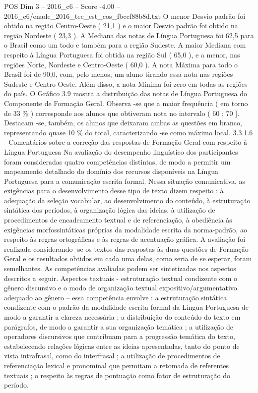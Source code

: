 \begin{textsample}{POS Dim 3 – 2016\_c6 – Score -4.00 – 2016\_c6/enade\_2016\_tec\_est\_cos\_fbccf88b8d.txt}
O menor Desvio padrão foi obtido na região Centro-Oeste ( 21,1 ) e o maior Desvio padrão foi obtido na região Nordeste ( 23,3 ).
A Mediana das notas de Língua Portuguesa foi 62,5 para o Brasil como um todo e também para a região Sudeste.
A maior Mediana com respeito à Língua Portuguesa foi obtida na região Sul ( 65,0 ), e a menor, nas regiões Norte, Nordeste e Centro-Oeste ( 60,0 ).
A nota Máxima para todo o Brasil foi de 90,0, com, pelo menos, um aluno tirando essa nota nas regiões Sudeste e Centro-Oeste.
Além disso, a nota Mínima foi zero em todas as regiões do país.
O Gráfico 3.9 mostra a distribuição das notas de Língua Portuguesa do Componente de Formação Geral.
Observa -se que a maior frequência ( em torno de 33 \% ) corresponde aos alunos que obtiveram nota no intervalo ( 60 ; 70 ].
Destacam -se, também, os alunos que deixaram ambas as questões em branco, representando quase 10 \% do total, caracterizando -se como máximo local. 3.3.1.6 - Comentários sobre a correção das respostas de Formação Geral com respeito à Língua Portuguesa Na avaliação do desempenho linguístico dos participantes foram consideradas quatro competências distintas, de modo a permitir um mapeamento detalhado do domínio dos recursos disponíveis na Língua Portuguesa para a comunicação escrita formal.
Nessa situação comunicativa, as exigências para o desenvolvimento desse tipo de texto dizem respeito : à adequação da seleção vocabular, ao desenvolvimento do conteúdo, à estruturação sintática dos períodos, à organização lógica das ideias, à utilização de procedimentos de encadeamento textual e de referenciação, à obediência às exigências morfossintáticas próprias da modalidade escrita da norma-padrão, ao respeito às regras ortográficas e às regras de acentuação gráfica.
A avaliação foi realizada considerando -se os textos das respostas às duas questões de Formação Geral e os resultados obtidos em cada uma delas, como seria de se esperar, foram semelhantes.
As competências avaliadas podem ser sintetizadas nos aspectos descritos a seguir.
Aspectos textuais - estruturação textual condizente com o gênero discursivo e o modo de organização textual expositivo/argumentativo adequado ao gênero – essa competência envolve : a estruturação sintática condizente com o padrão da modalidade escrita formal da Língua Portuguesa de modo a garantir a clareza necessária ; a distribuição do conteúdo do texto em parágrafos, de modo a garantir a sua organização temática ; a utilização de operadores discursivos que contribuam para a progressão temática do texto, estabelecendo relações lógicas entre as ideias apresentadas, tanto do ponto de vista intrafrasal, como do interfrasal ; a utilização de procedimentos de referenciação lexical e pronominal que permitam a retomada de referentes textuais ; o respeito às regras de pontuação como fator de estruturação do período.

\end{textsample}
